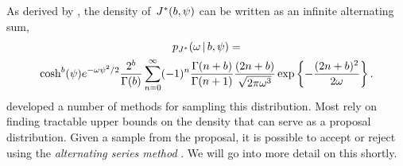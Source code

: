 As derived by \citet{windle2014sampling}, the density
of~$J^{*}(b,\psi)$ can be written as an infinite alternating
sum,
\begin{multline}
  \label{eq:jacobi_density}
  p_{J^{*}}({\omega} \,|\, b, \psi) = \\ 
  \cosh^b(\psi) e^{-{\omega} \psi^2/2} \frac{2^b}{\Gamma(b)} 
  \sum_{n=0}^\infty (-1)^n \frac{\Gamma(n+b)}{\Gamma(n+1)} \frac{(2n+b)}{\sqrt{2\pi {\omega}^3}}
  \exp\left\{- \frac{(2n+b)^2}{2{\omega}} \right\}.
\end{multline}
\citet{windle2014sampling} developed a number of methods for sampling
this distribution. Most rely on finding tractable upper bounds on the density
that can serve as a proposal distribution. Given a sample from the proposal,
it is possible to accept or reject using the \emph{alternating series method} \citep{devroye1986}. We will go into more detail on this shortly.


